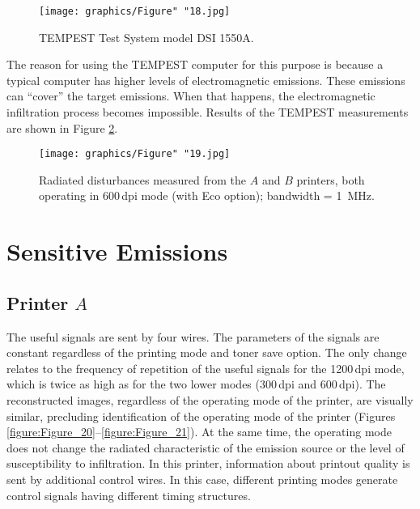 \documentclass[12pt,a4paper]{article}
\begin{document}
\begin{figure}[ht]
    \centering
    \texttt{[image: graphics/Figure" "18.jpg]}
    \caption{TEMPEST Test System model DSI 1550A.}
    \label{figure:Figure_18}
\end{figure}

The reason for using the TEMPEST computer for this purpose is because a
typical computer has higher levels of electromagnetic emissions. These
emissions can ``cover'' the target
emissions. When that happens, the electromagnetic infiltration process
becomes impossible. Results of the TEMPEST measurements are shown in Figure
\ref{figure:Figure_19}.

\begin{figure}[ht]
    \centering
    \texttt{[image: graphics/Figure" "19.jpg]}
    \caption{Radiated disturbances measured from the $A$ and $B$ printers,
        both operating in 600\,dpi mode (with Eco option); bandwidth =
        \SI{1}{\mega\hertz}.}
    \label{figure:Figure_19}
\end{figure}

\section{Sensitive Emissions}

\subsection{Printer $A$}

The useful signals are sent by four wires. The parameters of the signals are
constant regardless of the printing mode and toner save option. The only
change relates to the frequency of repetition of the useful signals for the
1200\,dpi mode, which is twice as high as for the two lower modes (300\,dpi
and 600\,dpi). The reconstructed images, regardless of the operating mode of
the printer, are visually similar, precluding identification of the operating
mode of the printer (Figures \ref{figure:Figure_20}--\ref{figure:Figure_21}).
At the same time, the operating mode does not change the radiated
characteristic of the emission source or the level of susceptibility to
infiltration. In this printer, information about printout quality is sent by
additional control wires. In this case, different printing modes generate
control signals having different timing structures.
\end{document}
